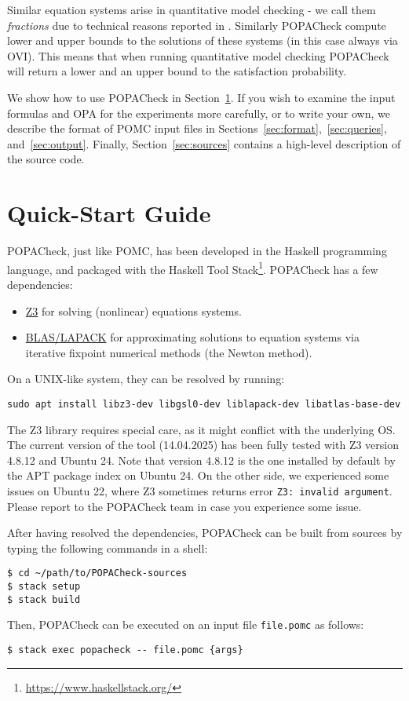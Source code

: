 \documentclass[9pt,a4paper]{article}
\begin{document}
Similar equation systems arise in quantitative model checking - we call them \emph{fractions} due to technical reasons reported in \cite{POPACheck}. Similarly POPACheck compute lower and upper bounds to the solutions of these systems (in this case always via OVI). This means that when running quantitative model checking POPACheck will return a lower and an upper bound to the satisfaction probability.

We show how to use POPACheck in Section~\ref{sec:quick-start}.
If you wish to examine the input formulas and OPA for the experiments more carefully,
or to write your own, we describe the format of POMC input files in Sections~\ref{sec:format},~\ref{sec:queries}, and~\ref{sec:output}.
Finally, Section~\ref{sec:sources} contains a high-level description of the source code.

\section{Quick-Start Guide}
\label{sec:quick-start}

POPACheck, just like POMC, has been developed in the Haskell programming language,
and packaged with the Haskell Tool Stack\footnote{\url{https://www.haskellstack.org/}}.
POPACheck has a few dependencies:
\begin{itemize}
    \item \href{https://microsoft.github.io/z3guide/z3}{Z3} for solving (nonlinear) equations systems.
    \item \href{https://www.netlib.org/lapack/}{BLAS/LAPACK} for approximating solutions to equation systems via iterative fixpoint numerical methods (the Newton method).
\end{itemize}
On a UNIX-like system, they can be resolved by running:
\begin{verbatim}
sudo apt install libz3-dev libgsl0-dev liblapack-dev libatlas-base-dev
\end{verbatim}

The Z3 library requires special care, as it might conflict with the underlying OS. The current version of the tool (14.04.2025) has been fully tested with Z3 version 4.8.12 and Ubuntu 24. Note that version 4.8.12 is the one installed by default by the APT package index on Ubuntu 24. On the other side, we experienced some issues on Ubuntu 22, where Z3 sometimes returns error \verb|Z3: invalid argument|. Please report to the POPACheck team in case you experience some issue.

After having resolved the dependencies, POPACheck can be built from sources by typing the following commands in a shell:
\begin{verbatim}
$ cd ~/path/to/POPACheck-sources
$ stack setup
$ stack build
\end{verbatim}
Then, POPACheck can be executed on an input file \verb|file.pomc| as follows:
\begin{verbatim}
$ stack exec popacheck -- file.pomc {args}
\end{verbatim}
\end{document}
